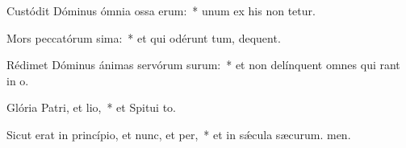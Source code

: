 \item Custódit Dóminus ómnia ossa erum:~* unum ex his non tetur.
\item Mors peccatórum sima:~* et qui odérunt tum, dequent.
\item Rédimet Dóminus ánimas servórum surum:~* et non delínquent omnes qui rant in o.
\item Glória Patri, et lio,~* et Spitui to.
\item Sicut erat in princípio, et nunc, et per,~* et in sǽcula sæcurum. men.
